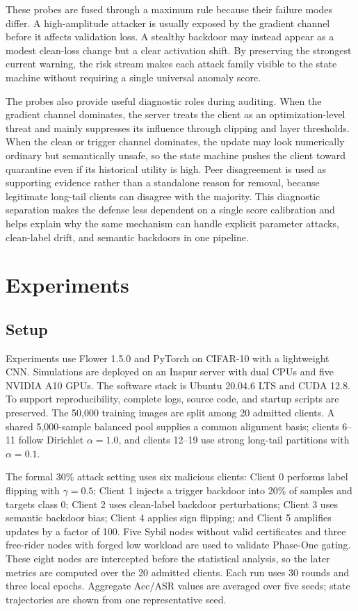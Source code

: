 \documentclass[runningheads,orivec]{llncs}
\begin{document}
These probes are fused through a maximum rule because their failure modes differ. A high-amplitude attacker is usually exposed by the gradient channel before it affects validation loss. A stealthy backdoor may instead appear as a modest clean-loss change but a clear activation shift. By preserving the strongest current warning, the risk stream makes each attack family visible to the state machine without requiring a single universal anomaly score.

The probes also provide useful diagnostic roles during auditing. When the gradient channel dominates, the server treats the client as an optimization-level threat and mainly suppresses its influence through clipping and layer thresholds. When the clean or trigger channel dominates, the update may look numerically ordinary but semantically unsafe, so the state machine pushes the client toward quarantine even if its historical utility is high. Peer disagreement is used as supporting evidence rather than a standalone reason for removal, because legitimate long-tail clients can disagree with the majority. This diagnostic separation makes the defense less dependent on a single score calibration and helps explain why the same mechanism can handle explicit parameter attacks, clean-label drift, and semantic backdoors in one pipeline.

\section{Experiments}

\subsection{Setup}

Experiments use Flower 1.5.0 and PyTorch on CIFAR-10 with a lightweight CNN. Simulations are deployed on an Inspur server with dual CPUs and five NVIDIA A10 GPUs. The software stack is Ubuntu 20.04.6 LTS and CUDA 12.8. To support reproducibility, complete logs, source code, and startup scripts are preserved. The 50,000 training images are split among 20 admitted clients. A shared 5,000-sample balanced pool supplies a common alignment basis; clients 6--11 follow Dirichlet $\alpha=1.0$, and clients 12--19 use strong long-tail partitions with $\alpha=0.1$.

The formal 30\% attack setting uses six malicious clients: Client 0 performs label flipping with $\gamma=0.5$; Client 1 injects a trigger backdoor into 20\% of samples and targets class 0; Client 2 uses clean-label backdoor perturbations; Client 3 uses semantic backdoor bias; Client 4 applies sign flipping; and Client 5 amplifies updates by a factor of 100. Five Sybil nodes without valid certificates and three free-rider nodes with forged low workload are used to validate Phase-One gating. These eight nodes are intercepted before the statistical analysis, so the later metrics are computed over the 20 admitted clients. Each run uses 30 rounds and three local epochs. Aggregate Acc/ASR values are averaged over five seeds; state trajectories are shown from one representative seed.
\end{document}
